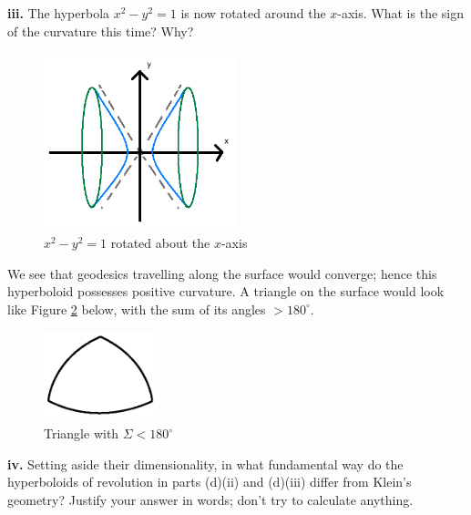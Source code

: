 \documentclass[a4paper]{article} %
\begin{document}

\begin{framed}
\textbf{iii.} The hyperbola $x^2-y^2=1$ is now rotated around the $x$-axis. What is the sign of the curvature this time? Why?
\end{framed}

\begin{figure}[h]
\centering
\includegraphics[width=0.5\textwidth]{images/diii.png}
\caption{$x^2-y^2=1$ rotated about the $x$-axis}
\label{diii figure}
\end{figure}

We see that geodesics travelling along the surface would converge; hence this hyperboloid possesses positive curvature. A triangle on the surface would look like Figure \ref{pos curv triangle} below, with the sum of its angles $> 180^{\circ}$.

\begin{figure}[h]
\centering
\includegraphics[width=0.3\textwidth]{images/positiveCurvTriangle.png}
\caption{Triangle with $\Sigma<180^{\circ}$}
\label{pos curv triangle}
\end{figure}



\begin{framed}
\textbf{iv.} Setting aside their dimensionality, in what fundamental way do the hyperboloids of revolution in parts (d)(ii) and (d)(iii) differ from Klein's geometry? Justify your answer in words; don’t try to calculate anything.
\end{framed}
\end{document}
